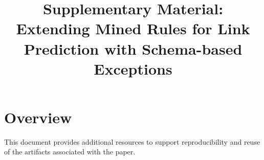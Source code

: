 \documentclass[runningheads]{llncs}
\begin{document}
\sloppy

\title{Supplementary Material: Extending Mined Rules for Link Prediction with Schema-based Exceptions}
\author{}
\institute{}
\maketitle

\section*{Overview}
This document provides additional resources to support reproducibility and reuse of the artifacts associated with the paper. 




\end{document}
